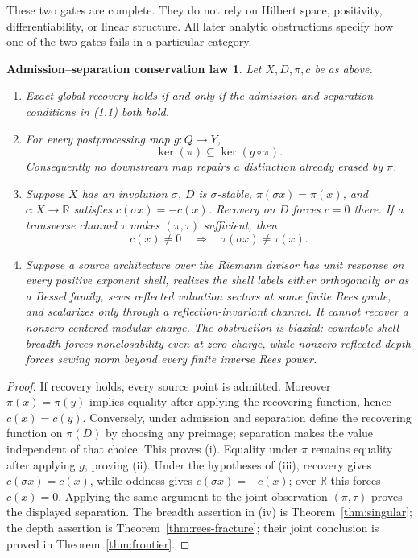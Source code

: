\documentclass[11pt]{article}
\newtheorem{sourcelaw}[theorem]{Admission--separation conservation law}
\theoremstyle{definition}
\theoremstyle{remark}
\newcommand{\R}{\mathbb R}
\begin{document}
These two gates are complete.  They do not rely on Hilbert space, positivity, differentiability,
or linear structure.  All later analytic obstructions specify how one of the two gates fails in a
particular category.

\begin{sourcelaw}\label{law:main}
Let $X,D,\pi,c$ be as above.
\begin{enumerate}[label=\textup{(\roman*)}]
\item Exact global recovery holds if and only if the admission and separation conditions
in \textup{(1.1)} both hold.
\item For every postprocessing map $g:Q\to Y$,
\[
 \ker(\pi)\subseteq\ker(g\circ\pi).
\]
Consequently no downstream map repairs a distinction already erased by $\pi$.
\item Suppose $X$ has an involution $\sigma$, $D$ is $\sigma$-stable,
$\pi(\sigma x)=\pi(x)$, and $c:X\to\R$ satisfies $c(\sigma x)=-c(x)$.  Recovery on $D$ forces
$c=0$ there.  If a transverse channel $\tau$ makes $(\pi,\tau)$ sufficient, then
\[
 c(x)\ne0\quad\Longrightarrow\quad \tau(\sigma x)\ne\tau(x).
\]
\item Suppose a source architecture over the Riemann divisor has unit response on every positive
exponent shell, realizes the shell labels either orthogonally or as a Bessel family, sews reflected
valuation sectors at some finite Rees grade, and scalarizes only through a reflection-invariant
channel.  It cannot recover a nonzero centered modular charge.  The obstruction is biaxial:
countable shell breadth forces nonclosability even at zero charge, while nonzero reflected depth
forces sewing norm beyond every finite inverse Rees power.
\end{enumerate}
\end{sourcelaw}

\begin{proof}
If recovery holds, every source point is admitted.  Moreover $\pi(x)=\pi(y)$ implies equality
after applying the recovering function, hence $c(x)=c(y)$.  Conversely, under admission and
separation define the recovering function on $\pi(D)$ by choosing any preimage; separation makes
the value independent of that choice.  This proves (i).  Equality under $\pi$ remains equality
after applying $g$, proving (ii).  Under the hypotheses of (iii), recovery gives
$c(\sigma x)=c(x)$, while oddness gives $c(\sigma x)=-c(x)$; over $\R$ this forces $c(x)=0$.
Applying the same argument to the joint observation $(\pi,\tau)$ proves the displayed separation.
The breadth assertion in (iv) is Theorem~\ref{thm:singular}; the depth assertion is
Theorem~\ref{thm:rees-fracture}; their joint conclusion is proved in
Theorem~\ref{thm:frontier}.
\end{proof}
\end{document}
